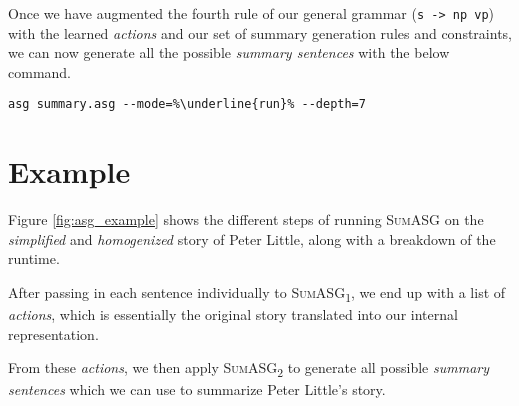Once we have augmented the fourth rule of our general grammar (\texttt{s -> np vp}) with the learned \textit{actions} and our set of summary generation rules and constraints, we can now generate all the possible \textit{summary sentences} with the below command.

\begin{displayquote}
\begin{lstlisting}[numbers=none, escapechar=\%]
asg summary.asg --mode=%\underline{run}% --depth=7
\end{lstlisting}
\end{displayquote}

\section{Example}

Figure \ref{fig:asg_example} shows the different steps of running \textsc{SumASG} on the \textit{simplified} and \textit{homogenized} story of Peter Little, along with a breakdown of the runtime.

After passing in each sentence individually to \textsc{SumASG\textsubscript{1}}, we end up with a list of \textit{actions}, which is essentially the original story translated into our internal representation.

From these \textit{actions}, we then apply \textsc{SumASG\textsubscript{2}} to generate all possible \textit{summary sentences} which we can use to summarize Peter Little's story.

